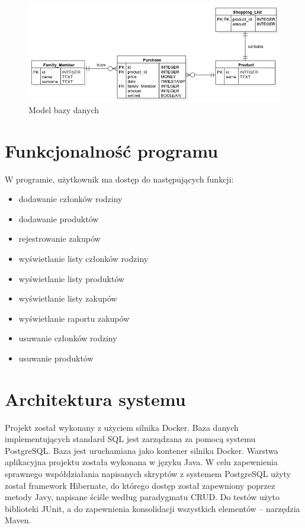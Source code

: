 \documentclass[a4paper,11pt]{article}
\begin{document}
\begin{figure}[h!]
	\centering
	\includegraphics[scale=0.5]{P1.png}
	\caption{Model bazy danych}
	\label{fig:p1}
\end{figure}

\section{Funkcjonalność programu}
W programie, użytkownik ma dostęp do następujących funkcji:
\begin{itemize}
	\item dodawanie członków rodziny
	\item dodawanie produktów
	\item rejestrowanie zakupów
	\item wyświetlanie listy członków rodziny
	\item wyświetlanie listy produktów
	\item wyświetlanie listy zakupów
	\item wyświetlanie raportu zakupów
	\item usuwanie członków rodziny
	\item usuwanie produktów
\end{itemize}

\section{Architektura systemu}
Projekt został wykonany z użyciem silnika Docker. Baza danych implementujących standard SQL jest zarządzana za pomocą systemu PostgreSQL. Baza jest uruchamiana jako kontener silnika Docker. Warstwa aplikacyjna projektu została wykonana w języku Java. W celu zapewnienia sprawnego współdziałania napisanych skryptów z systemem PostgreSQL użyty został framework Hibernate, do którego dostęp został zapewniony poprzez metody Javy, napisane ściśle według paradygmatu CRUD. Do testów użyto biblioteki JUnit, a do zapewnienia konsolidacji wszystkich elementów -- narzędzia Maven.
\end{document}
